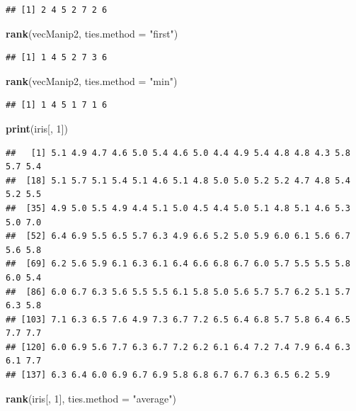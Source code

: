 \documentclass[]{book}
\newenvironment{Shaded}{\begin{snugshade}}{\end{snugshade}}
\newcommand{\DataTypeTok}[1]{\textcolor[rgb]{0.13,0.29,0.53}{#1}}
\newcommand{\DecValTok}[1]{\textcolor[rgb]{0.00,0.00,0.81}{#1}}
\newcommand{\KeywordTok}[1]{\textcolor[rgb]{0.13,0.29,0.53}{\textbf{#1}}}
\newcommand{\NormalTok}[1]{#1}
\newcommand{\StringTok}[1]{\textcolor[rgb]{0.31,0.60,0.02}{#1}}
\begin{document}
\begin{verbatim}
## [1] 2 4 5 2 7 2 6
\end{verbatim}

\begin{Shaded}
\begin{Highlighting}[]
\KeywordTok{rank}\NormalTok{(vecManip2, }\DataTypeTok{ties.method =} \StringTok{"first"}\NormalTok{)}
\end{Highlighting}
\end{Shaded}

\begin{verbatim}
## [1] 1 4 5 2 7 3 6
\end{verbatim}

\begin{Shaded}
\begin{Highlighting}[]
\KeywordTok{rank}\NormalTok{(vecManip2, }\DataTypeTok{ties.method =} \StringTok{"min"}\NormalTok{)}
\end{Highlighting}
\end{Shaded}

\begin{verbatim}
## [1] 1 4 5 1 7 1 6
\end{verbatim}

\begin{Shaded}
\begin{Highlighting}[]
\KeywordTok{print}\NormalTok{(iris[, }\DecValTok{1}\NormalTok{])}
\end{Highlighting}
\end{Shaded}

\begin{verbatim}
##   [1] 5.1 4.9 4.7 4.6 5.0 5.4 4.6 5.0 4.4 4.9 5.4 4.8 4.8 4.3 5.8 5.7 5.4
##  [18] 5.1 5.7 5.1 5.4 5.1 4.6 5.1 4.8 5.0 5.0 5.2 5.2 4.7 4.8 5.4 5.2 5.5
##  [35] 4.9 5.0 5.5 4.9 4.4 5.1 5.0 4.5 4.4 5.0 5.1 4.8 5.1 4.6 5.3 5.0 7.0
##  [52] 6.4 6.9 5.5 6.5 5.7 6.3 4.9 6.6 5.2 5.0 5.9 6.0 6.1 5.6 6.7 5.6 5.8
##  [69] 6.2 5.6 5.9 6.1 6.3 6.1 6.4 6.6 6.8 6.7 6.0 5.7 5.5 5.5 5.8 6.0 5.4
##  [86] 6.0 6.7 6.3 5.6 5.5 5.5 6.1 5.8 5.0 5.6 5.7 5.7 6.2 5.1 5.7 6.3 5.8
## [103] 7.1 6.3 6.5 7.6 4.9 7.3 6.7 7.2 6.5 6.4 6.8 5.7 5.8 6.4 6.5 7.7 7.7
## [120] 6.0 6.9 5.6 7.7 6.3 6.7 7.2 6.2 6.1 6.4 7.2 7.4 7.9 6.4 6.3 6.1 7.7
## [137] 6.3 6.4 6.0 6.9 6.7 6.9 5.8 6.8 6.7 6.7 6.3 6.5 6.2 5.9
\end{verbatim}

\begin{Shaded}
\begin{Highlighting}[]
\KeywordTok{rank}\NormalTok{(iris[, }\DecValTok{1}\NormalTok{], }\DataTypeTok{ties.method =} \StringTok{"average"}\NormalTok{)}
\end{Highlighting}
\end{Shaded}
\end{document}
